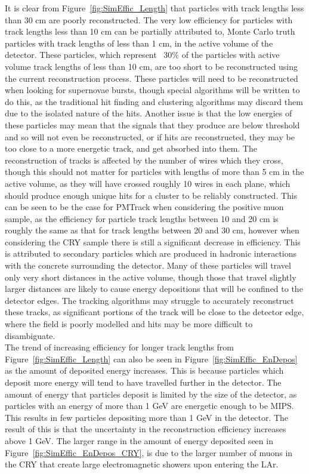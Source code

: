 It is clear from Figure~\ref{fig:SimEffic_Length} that particles with track lengths less than 30 cm are poorly reconstructed. The very low efficiency for particles with track lengths less than 10 cm can be partially attributed to, Monte Carlo truth particles with track lengths of less than 1 cm, in the active volume of the detector. These particles, which represent ~30\% of the particles with active volume track lengths of less than 10 cm, are too short to be reconstructed using the current reconstruction process. These particles will need to be reconstructed when looking for supernovae bursts, though special algorithms will be written to do this, as the traditional hit finding and clustering algorithms may discard them due to the isolated nature of the hits. Another issue is that the low energies of these particles may mean that the signals that they produce are below threshold and so will not even be reconstructed, or if hits are reconstructed, they may be too close to a more energetic track, and get absorbed into them. The reconstruction of tracks is affected by the number of wires which they cross, though this should not matter for particles with lengths of more than 5 cm in the active volume, as they will have crossed roughly 10 wires in each plane, which should produce enough unique hits for a cluster to be reliably constructed. This can be seen to be the case for PMTrack when considering the positive muon sample, as the efficiency for particle track lengths between 10 and 20 cm is roughly the same as that for track lengths between 20 and 30 cm, however when considering the CRY sample there is still a significant decrease in efficiency. This is attributed to secondary particles which are produced in hadronic interactions with the concrete surrounding the detector. Many of these particles will travel only very short distances in the active volume, though those that travel slightly larger distances are likely to cause energy depositions that will be confined to the detector edges. The tracking algorithms may struggle to accurately reconstruct these tracks, as significant portions of the track will be close to the detector edge, where the field is poorly modelled and hits may be more difficult to disambiguate. \\

The trend of increasing efficiency for longer track lengths from Figure~\ref{fig:SimEffic_Length} can also be seen in Figure~\ref{fig:SimEffic_EnDepos} as the amount of deposited energy increases. This is because particles which deposit more energy will tend to have travelled further in the detector. The amount of energy that particles deposit is limited by the size of the detector, as particles with an energy of more than 1 GeV are energetic enough to be MIPS. This results in few particles depositing more than 1 GeV in the detector. The result of this is that the uncertainty in the reconstruction efficiency increases above 1 GeV. The larger range in the amount of energy deposited seen in Figure~\ref{fig:SimEffic_EnDepos_CRY}, is due to the larger number of muons in the CRY that create large electromagnetic showers upon entering the LAr. \\

